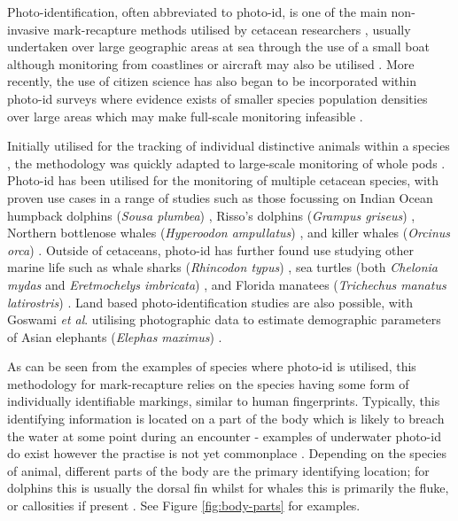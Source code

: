 Photo-identification, often abbreviated to photo-id, is one of the main non-invasive mark-recapture methods utilised by cetacean researchers \cite{hammond_individual_1990, evans_monitoring_2004}, usually undertaken over large geographic areas at sea through the use of a small boat although monitoring from coastlines or aircraft may also be utilised \cite{payne_long_1986, forney_seasonal_1998, wursig_methods_1990}. More recently, the use of citizen science has also began to be incorporated within photo-id surveys where evidence exists of smaller species population densities over large areas which may make full-scale monitoring infeasible \cite{gibson_using_2020, cheney_integrating_2013}.

Initially utilised for the tracking of individual distinctive animals within a species \cite{caldwell_evidence_1955, schevill_daily_1960}, the methodology was quickly adapted to large-scale monitoring of whole pods \cite{alves_population_2013, franklin_migratory_2008}. Photo-id has been utilised for the monitoring of multiple cetacean species, with proven use cases in a range of studies such as those focussing on Indian Ocean humpback dolphins (\textit{Sousa plumbea}) \cite{sharpe_indian_2019}, Risso's dolphins (\textit{Grampus griseus}) \cite{miragliuolo_rissos_2004}, Northern bottlenose whales (\textit{Hyperoodon ampullatus}) \cite{feyrer_origin_2021}, and killer whales (\textit{Orcinus orca}) \cite{bigg_assessment_1982}. Outside of cetaceans, photo-id has further found use studying other marine life such as whale sharks (\textit{Rhincodon typus}) \cite{holmberg_estimating_2009}, sea turtles (both \textit{Chelonia mydas} and \textit{Eretmochelys imbricata}) \cite{reisser_photographic_2008}, and Florida manatees (\textit{Trichechus manatus latirostris}) \cite{langtimm_survival_2004}. Land based photo-identification studies are also possible, with Goswami \textit{et al}. utilising photographic data to estimate demographic parameters of Asian elephants (\textit{Elephas maximus}) \cite{goswami_application_2007}.

As can be seen from the examples of species where photo-id is utilised, this methodology for mark-recapture relies on the species having some form of individually identifiable markings, similar to human fingerprints. Typically, this identifying information is located on a part of the body which is likely to breach the water at some point during an encounter - examples of underwater photo-id do exist however the practise is not yet commonplace \cite{vanbressem_visual_2018, veronique_underwater_2022}. Depending on the species of animal, different parts of the body are the primary identifying location; for dolphins this is usually the dorsal fin whilst for whales this is primarily the fluke, or callosities if present \cite{vernazzani_eastern_2013, arnbom_individual_1987, constantine_abundance_2012, sharpe_indian_2019, baird_population_2009}. See Figure \ref{fig:body-parts} for examples.


